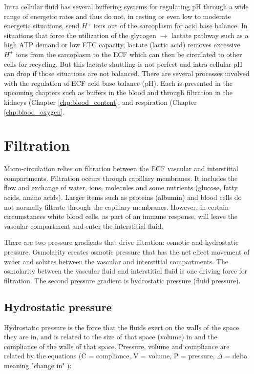 Intra cellular fluid has several buffering systems for regulating pH through a wide range of energetic rates and thus do not, in resting or even low to moderate energetic situations, send $H^+$ ions out of the sarcoplasm for acid base balance. In situations that force the utilization of the glycogen $\rightarrow$ lactate pathway such as a high ATP demand or low ETC capacity, lactate (lactic acid) removes excessive $H^+$ ions from the sarcoplasm to the ECF which can then be circulated to other cells for recycling. But this lactate shuttling is not perfect and intra cellular pH can drop if those situations are not balanced.
There are several processes involved with the regulation of ECF acid base balance (pH). Each is presented in the upcoming chapters such as buffers in the blood and through filtration in the kidneys (Chapter \ref{chp:blood_content}, and respiration (Chapter \ref{chp:blood_oxygen}.


\section{Filtration}

Micro-circulation relies on filtration between the ECF vascular and interstitial compartments. Filtration occurs through capillary membranes. It includes the flow and exchange of water, ions, molecules and some nutrients (glucose, fatty acids, amino acids). Larger items such as proteins (albumin) and blood cells do not normally filtrate through the capillary membranes. However, in certain circumstances white blood cells, as part of an immune response, will leave the vascular compartment and enter the interstitial fluid.

There are two pressure gradients that drive filtration: osmotic and hydrostatic pressure. Osmolarity creates osmotic pressure that has the net effect movement of water and solutes between the vascular and interstitial compartments. The osmolarity between the vascular fluid and interstitial fluid is one driving force for filtration. The second pressure gradient is hydrostatic pressure (fluid pressure). 

\subsection{Hydrostatic pressure}
Hydrostatic pressure is the force that the fluids exert on the walls of the space they are in, and is related to the size of that space (volume) in and the compliance of the walls of that space.\footnotemark{} Pressure, volume and compliance are related by the equations (C = compliance, V = volume, P = pressure, $\Delta$ = delta meaning "change in" ):

